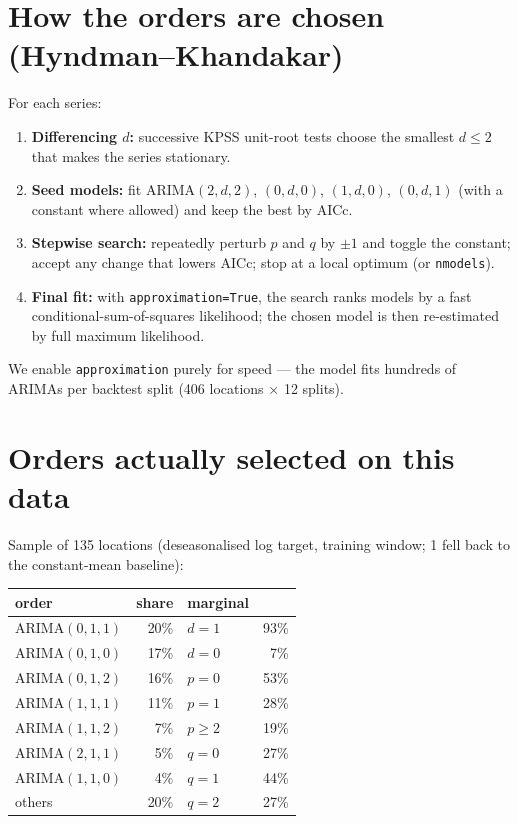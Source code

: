 \documentclass[11pt]{article}
\newcommand{\code}[1]{\texttt{\small #1}}
\begin{document}
\section{How the orders are chosen (Hyndman--Khandakar)}
For each series:
\begin{enumerate}
\item \textbf{Differencing $d$:} successive KPSS unit-root tests choose the smallest $d\le 2$
      that makes the series stationary.
\item \textbf{Seed models:} fit ARIMA$(2,d,2)$, $(0,d,0)$, $(1,d,0)$, $(0,d,1)$ (with a
      constant where allowed) and keep the best by AICc.
\item \textbf{Stepwise search:} repeatedly perturb $p$ and $q$ by $\pm1$ and toggle the
      constant; accept any change that lowers AICc; stop at a local optimum (or \code{nmodels}).
\item \textbf{Final fit:} with \code{approximation=True}, the search ranks models by a fast
      conditional-sum-of-squares likelihood; the chosen model is then re-estimated by full
      maximum likelihood.
\end{enumerate}
We enable \code{approximation} purely for speed --- the model fits hundreds of ARIMAs per
backtest split (406 locations $\times$ 12 splits).

\section{Orders actually selected on this data}
Sample of 135 locations (deseasonalised log target, training window; 1 fell back to the
constant-mean baseline):

\begin{center}\small
\begin{tabular}{@{}lr@{\quad}lr@{}}
\toprule
order & share & marginal & \\
\midrule
ARIMA$(0,1,1)$ & 20\% & $d=1$ & 93\% \\
ARIMA$(0,1,0)$ & 17\% & $d=0$ & 7\% \\
ARIMA$(0,1,2)$ & 16\% & $p=0$ & 53\% \\
ARIMA$(1,1,1)$ & 11\% & $p=1$ & 28\% \\
ARIMA$(1,1,2)$ & \phantom{0}7\% & $p\ge 2$ & 19\% \\
ARIMA$(2,1,1)$ & \phantom{0}5\% & $q=0$ & 27\% \\
ARIMA$(1,1,0)$ & \phantom{0}4\% & $q=1$ & 44\% \\
others & 20\% & $q=2$ & 27\% \\
\bottomrule
\end{tabular}
\end{center}
\end{document}

